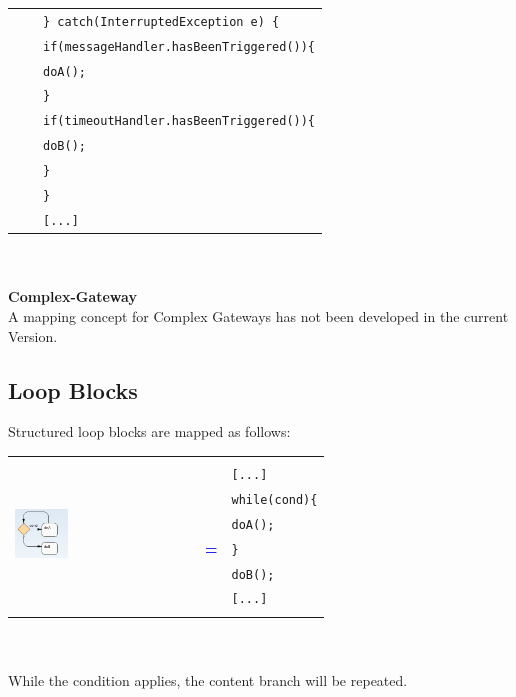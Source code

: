 \begin{tabularx}{\linewidth}{lcX}
	& & \texttt{\} catch(InterruptedException e) \{}\\
	& & \texttt{\hspace{10pt}if(messageHandler.hasBeenTriggered())\{}\\
	& & \texttt{\hspace{20pt}doA();}\\
	& & \texttt{\hspace{10pt}\}}\\
	& & \texttt{\hspace{10pt}if(timeoutHandler.hasBeenTriggered())\{}\\
	& & \texttt{\hspace{20pt}doB();}\\
	& & \texttt{\hspace{10pt}\}}\\
	& & \texttt{\}}\\
	& & \texttt{[...]}\\
\end{tabularx}\\\\

\textbf{Complex-Gateway}\\
A mapping concept for Complex Gateways has not been developed in the current Version. 

\subsection{Loop Blocks}
Structured loop blocks are mapped as follows:\\
\begin{tabularx}{\linewidth}{lcX}
	\multirow{8}{*}{\includegraphics[width=0.3\textwidth]{images/mapping/loop_block.png}} &  &\\
	& & \texttt{[...]}\\
	& & \texttt{while(cond)\{}\\
	& & \texttt{\hspace{10pt}doA();}\\
	& \textbf{\textcolor{blue}{=}} & \texttt{\}}\\
	& & \texttt{doB();}\\
	& & \texttt{[...]}\\
	& & \\
\end{tabularx}\\\\
While the condition applies, the content branch will be repeated. 

